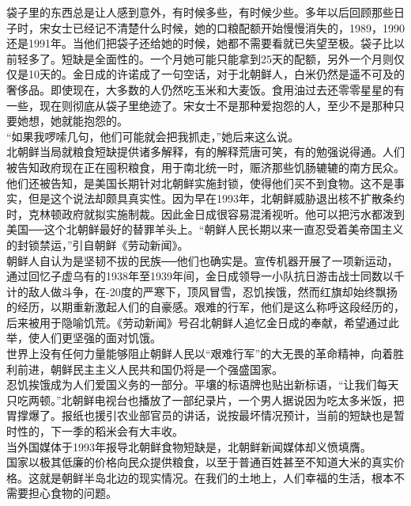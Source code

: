 袋子里的东西总是让人感到意外，有时候多些，有时候少些。多年以后回顾那些日子时，宋女士已经记不清楚什么时候，她的口粮配额开始慢慢消失的，1989，1990还是1991年。当他们把袋子还给她的时候，她都不需要看就已失望至极。袋子比以前轻多了。短缺是全面性的。一个月她可能只能拿到25天的配额，另外一个月则仅仅是10天的。金日成的许诺成了一句空话，对于北朝鲜人，白米仍然是遥不可及的奢侈品。即使现在，大多数的人仍然吃玉米和大麦饭。食用油过去还零零星星的有一些，现在则彻底从袋子里绝迹了。宋女士不是那种爱抱怨的人，至少不是那种只要她想，她就能抱怨的。\\

“如果我啰嗦几句，他们可能就会把我抓走，”她后来这么说。\\

北朝鲜当局就粮食短缺提供诸多解释，有的解释荒唐可笑，有的勉强说得通。人们被告知政府现在正在囤积粮食，用于南北统一时，赈济那些饥肠辘辘的南方民众。他们还被告知，是美国长期针对北朝鲜实施封锁，使得他们买不到食物。这不是事实，但是这个说法却颇具真实性。因为早在1993年，北朝鲜威胁退出核不扩散条约时，克林顿政府就拟实施制裁。因此金日成很容易混淆视听。他可以把污水都泼到美国──这个北朝鲜最好的替罪羊头上。“朝鲜人民长期以来一直忍受着美帝国主义的封锁禁运，”引自朝鲜《劳动新闻》。\\

朝鲜人自认为是坚韧不拔的民族──他们也确实是。宣传机器开展了一项新运动，通过回忆子虚乌有的1938年至1939年间，金日成领导一小队抗日游击战士同数以千计的敌人做斗争，在-20度的严寒下，顶风冒雪，忍饥挨饿，然而红旗却始终飘扬的经历，以期重新激起人们的自豪感。艰难的行军，他们是这么称呼这段经历的，后来被用于隐喻饥荒。《劳动新闻》号召北朝鲜人追忆金日成的奉献，希望通过此举，使人们更坚强的面对饥饿。\\

世界上没有任何力量能够阻止朝鲜人民以“艰难行军”的大无畏的革命精神，向着胜利前进，朝鲜民主主义人民共和国仍将是一个强盛国家。\\

忍饥挨饿成为人们爱国义务的一部分。平壤的标语牌也贴出新标语，“让我们每天只吃两顿。”北朝鲜电视台也播放了一部纪录片，一个男人据说因为吃太多米饭，把胃撑爆了。报纸也援引农业部官员的讲话，说按最坏情况预计，当前的短缺也是暂时性的，下一季的稻米会有大丰收。\\

当外国媒体于1993年报导北朝鲜食物短缺是，北朝鲜新闻媒体却义愤填膺。\\

国家以极其低廉的价格向民众提供粮食，以至于普通百姓甚至不知道大米的真实价格。这就是朝鲜半岛北边的现实情况。在我们的土地上，人们幸福的生活，根本不需要担心食物的问题。\\

